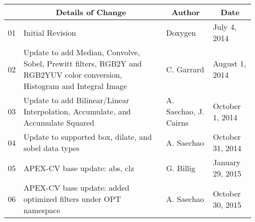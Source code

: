 \documentclass[oneside]{book}
\newcommand{\+}{\discretionary{\mbox{\scriptsize$\hookleftarrow$}}{}{}}
\begin{document}
\renewcommand{\arraystretch}{1.5}
\begin{table}[h]
\centering
\begin{tabular}{|p{1cm}|p{8cm}|p{2.5cm}|p{2.5cm}|}
\hline
\rowcolor[HTML]{C0C0C0} 
\multicolumn{1}{|c|}{\cellcolor[HTML]{C0C0C0}\textbf{Version}} & \multicolumn{1}{|c|}{\cellcolor[HTML]{C0C0C0}\textbf{Details of Change}}                                                  & \multicolumn{1}{|c|}{\cellcolor[HTML]{C0C0C0}\textbf{Author}} & \multicolumn{1}{|c|}{\cellcolor[HTML]{C0C0C0}\textbf{Date}} \\ \hline
01                                                             & Initial Revision                                                                                                          & Doxygen                                                       & July 4, 2014                                              \\ \hline
02                                                             & Update to add Median, Convolve, Sobel, Prewitt filters, RGB2Y and RGB2YUV color conversion, Histogram and Integral Image  & C. Garrard                                                    & August 1, 2014                                            \\ \hline
03                                                             & Update to add Bilinear/Linear Interpolation, Accumulate, and Accumulate Squared                                           & A. Saechao, \newline J. Cairns                                & October 1, 2014                                           \\ \hline
04                                                             & Update to supported box, dilate, and sobel data types                                                                     & A. Saechao                                                    & October 31, 2014                                          \\ \hline
05                                                             & APEX-CV base update: abs, clz                                                                                             & G. Billig                                                     & January 29, 2015                                          \\ \hline
06                                                             & APEX-CV base update: added optimized filters under OPT namespace                                                          & A. Saechao                                                    & October 30, 2015                                          \\ \hline

\end{tabular}
\end{table}
\end{document}
